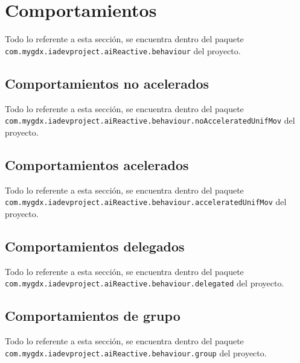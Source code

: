 \medskip
\section{Comportamientos}
Todo lo referente a esta sección, se encuentra dentro del paquete \texttt{com.mygdx.iadevproject.aiReactive.behaviour} del proyecto.


\medskip
\subsection{Comportamientos no acelerados}
Todo lo referente a esta sección, se encuentra dentro del paquete \texttt{com.mygdx.iadevproject.aiReactive.behaviour.noAcceleratedUnifMov} del proyecto.



\medskip
\subsection{Comportamientos acelerados}
Todo lo referente a esta sección, se encuentra dentro del paquete \texttt{com.mygdx.iadevproject.aiReactive.behaviour.acceleratedUnifMov} del proyecto.



\medskip
\subsection{Comportamientos delegados}
Todo lo referente a esta sección, se encuentra dentro del paquete \texttt{com.mygdx.iadevproject.aiReactive.behaviour.delegated} del proyecto.



\medskip
\subsection{Comportamientos de grupo}
Todo lo referente a esta sección, se encuentra dentro del paquete \texttt{com.mygdx.iadevproject.aiReactive.behaviour.group} del proyecto.
